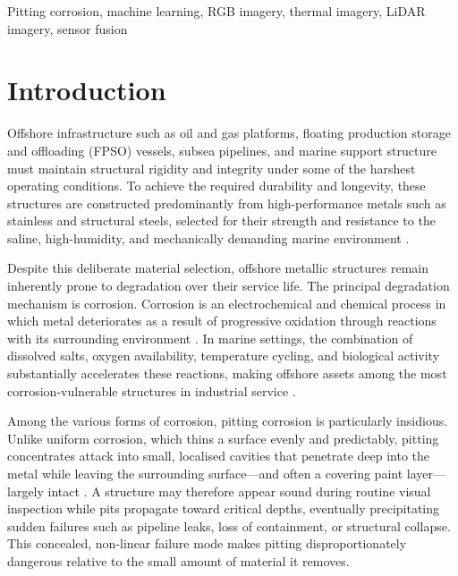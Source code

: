 \begin{IEEEkeywords}
    Pitting corrosion, machine learning, RGB imagery, thermal imagery, LiDAR imagery, sensor fusion
\end{IEEEkeywords}



\section{Introduction}

Offshore infrastructure such as oil and gas platforms, floating production storage and offloading (FPSO) vessels, subsea pipelines, and marine support structure must maintain structural rigidity and integrity under some of the harshest operating conditions. To achieve the required durability and longevity, these structures are constructed predominantly from high-performance metals such as stainless and structural steels, selected for their strength and resistance to the saline, high-humidity, and mechanically demanding marine environment \cite{dalmora2025methods}.

Despite this deliberate material selection, offshore metallic structures remain inherently prone to degradation over their service life. The principal degradation mechanism is corrosion. Corrosion is an electrochemical and chemical process in which metal deteriorates as a result of progressive oxidation through reactions with its surrounding environment \cite{balangao2024corrosion}. In marine settings, the combination of dissolved salts, oxygen availability, temperature cycling, and biological activity substantially accelerates these reactions, making offshore assets among the most corrosion-vulnerable structures in industrial service \cite{dalmora2025methods}.

Among the various forms of corrosion, pitting corrosion is particularly insidious. Unlike uniform corrosion, which thins a surface evenly and predictably, pitting concentrates attack into small, localised cavities that penetrate deep into the metal while leaving the surrounding surface—and often a covering paint layer—largely intact \cite{balangao2024corrosion}. A structure may therefore appear sound during routine visual inspection while pits propagate toward critical depths, eventually precipitating sudden failures such as pipeline leaks, loss of containment, or structural collapse. This concealed, non-linear failure mode makes pitting disproportionately dangerous relative to the small amount of material it removes.

